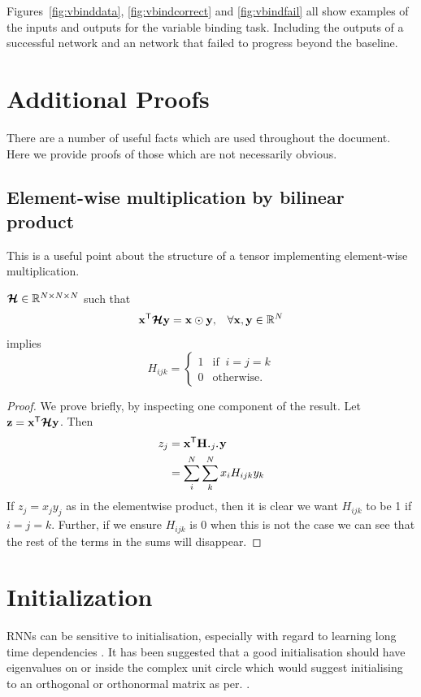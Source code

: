 Figures~\ref{fig:vbinddata}, \ref{fig:vbindcorrect} and \ref{fig:vbindfail} all show examples of
the inputs and outputs for the variable binding task. Including the outputs of a successful network
and an network that failed to progress beyond the baseline.

\chapter{Additional Proofs}
There are a number of useful facts which are used throughout the document. Here we provide
proofs of those which are not necessarily obvious.

\section{Element-wise multiplication by bilinear product}
This is a useful point about the structure of a tensor implementing element-wise
multiplication.
\begin{prop}  \label{prop:identity}
	\(\bm{\mathcal{H}} \in \mathbb{R}^{N \times N \times N}\) such that
\begin{align}
\mathbf{x}^\mathsf{T}\bm{\mathcal{H}}\mathbf{y} = \mathbf{x} \odot \mathbf{y}, 
&&\forall \mathbf{x},\mathbf{y} \in \mathbb{R}^{N}
\end{align} implies
\begin{equation}
	H_{ijk} = \begin{cases}
		1 & \text{if}\;\;i = j = k \\
		0 & \text{otherwise.}
	\end{cases}
\end{equation}

\end{prop}
\begin{proof}
We prove briefly, by inspecting one component of the result. Let 
\(\mathbf{z} = \mathbf{x}^\mathsf{T}\bm{\mathcal{H}}\mathbf{y}\). Then
\begin{align}
	z_j &= \vec{x}^\mathsf{T}\mat{H}_{\midbullet j \midbullet}\vec{y} \\
		&= \sum_i^N\sum_k^N x_iH_{ijk}y_k
\end{align}
If \(z_j = x_jy_j\) as in the elementwise product, then it is clear we want \(H_{ijk}\) to be 
1 if \(i=j=k\). Further, if we ensure \(H_{ijk}\) is 0 when this is not the case we can see that
the rest of the terms in the sums will disappear.
\end{proof}

\chapter{Initialization}\label{A:init}
RNNs can be sensitive to initialisation, especially with regard to learning long
time dependencies \autocite{Le2015}. It has been suggested that a good initialisation should
have eigenvalues on or inside the complex unit circle \autocite{Zilly2016, Mikolov2015} which
would suggest initialising to an orthogonal or orthonormal matrix as per. \autocite{Henaff2016}.

